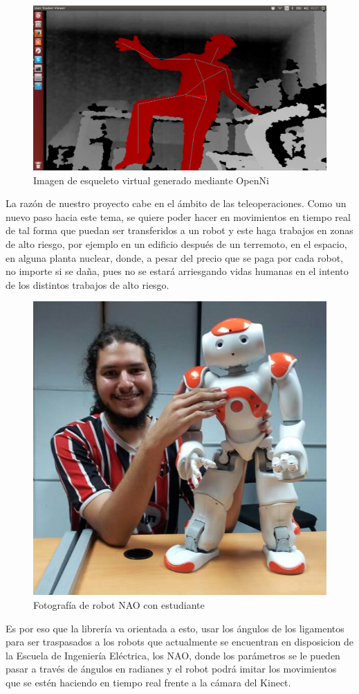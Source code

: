 \documentclass[letterpaper]{article}
\begin{document}
		\begin{figure}[h!]
			\centering
			\includegraphics[width=0.7\linewidth]{imagenes/person.png}
			\caption{Imagen de esqueleto virtual generado mediante OpenNi}
		\end{figure}

La razón de nuestro proyecto cabe en el ámbito de las teleoperaciones. Como un nuevo paso hacia este tema, se quiere poder hacer en movimientos en tiempo real de tal forma que puedan ser transferidos a un robot y este haga trabajos en zonas de alto riesgo, por ejemplo en un edificio después de un terremoto, en el espacio, en alguna planta nuclear, donde, a pesar del precio que se paga por cada robot, no importe si se daña, pues no se estará arriesgando vidas humanas en el intento de los distintos trabajos de alto riesgo.\\

		\begin{figure}[h!]
			\centering
			\includegraphics[width=0.4\linewidth]{imagenes/nao_and_me.jpg}
			\caption{Fotografía de robot NAO con estudiante}
		\end{figure}

Es por eso que la librería va orientada a esto, usar los ángulos de los ligamentos para ser traspasados a los robots que actualmente se encuentran en disposicion de la Escuela de Ingeniería Eléctrica, los NAO, donde los parámetros se le pueden pasar a través de ángulos en radianes y el robot podrá imitar los movimientos que se estén haciendo en tiempo real frente a la cámara del Kinect.\\
\end{document}
